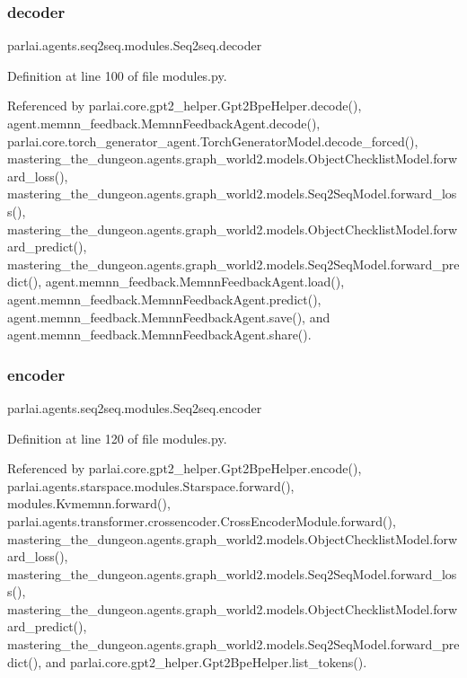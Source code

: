 \subsubsection{\texorpdfstring{decoder}{decoder}}
{\footnotesize\ttfamily parlai.\+agents.\+seq2seq.\+modules.\+Seq2seq.\+decoder}



Definition at line 100 of file modules.\+py.



Referenced by parlai.\+core.\+gpt2\+\_\+helper.\+Gpt2\+Bpe\+Helper.\+decode(), agent.\+memnn\+\_\+feedback.\+Memnn\+Feedback\+Agent.\+decode(), parlai.\+core.\+torch\+\_\+generator\+\_\+agent.\+Torch\+Generator\+Model.\+decode\+\_\+forced(), mastering\+\_\+the\+\_\+dungeon.\+agents.\+graph\+\_\+world2.\+models.\+Object\+Checklist\+Model.\+forward\+\_\+loss(), mastering\+\_\+the\+\_\+dungeon.\+agents.\+graph\+\_\+world2.\+models.\+Seq2\+Seq\+Model.\+forward\+\_\+loss(), mastering\+\_\+the\+\_\+dungeon.\+agents.\+graph\+\_\+world2.\+models.\+Object\+Checklist\+Model.\+forward\+\_\+predict(), mastering\+\_\+the\+\_\+dungeon.\+agents.\+graph\+\_\+world2.\+models.\+Seq2\+Seq\+Model.\+forward\+\_\+predict(), agent.\+memnn\+\_\+feedback.\+Memnn\+Feedback\+Agent.\+load(), agent.\+memnn\+\_\+feedback.\+Memnn\+Feedback\+Agent.\+predict(), agent.\+memnn\+\_\+feedback.\+Memnn\+Feedback\+Agent.\+save(), and agent.\+memnn\+\_\+feedback.\+Memnn\+Feedback\+Agent.\+share().

\mbox{\label{classparlai_1_1agents_1_1seq2seq_1_1modules_1_1Seq2seq_add3b14b89043ce0d8154810d082b0e52}} 
\subsubsection{\texorpdfstring{encoder}{encoder}}
{\footnotesize\ttfamily parlai.\+agents.\+seq2seq.\+modules.\+Seq2seq.\+encoder}



Definition at line 120 of file modules.\+py.



Referenced by parlai.\+core.\+gpt2\+\_\+helper.\+Gpt2\+Bpe\+Helper.\+encode(), parlai.\+agents.\+starspace.\+modules.\+Starspace.\+forward(), modules.\+Kvmemnn.\+forward(), parlai.\+agents.\+transformer.\+crossencoder.\+Cross\+Encoder\+Module.\+forward(), mastering\+\_\+the\+\_\+dungeon.\+agents.\+graph\+\_\+world2.\+models.\+Object\+Checklist\+Model.\+forward\+\_\+loss(), mastering\+\_\+the\+\_\+dungeon.\+agents.\+graph\+\_\+world2.\+models.\+Seq2\+Seq\+Model.\+forward\+\_\+loss(), mastering\+\_\+the\+\_\+dungeon.\+agents.\+graph\+\_\+world2.\+models.\+Object\+Checklist\+Model.\+forward\+\_\+predict(), mastering\+\_\+the\+\_\+dungeon.\+agents.\+graph\+\_\+world2.\+models.\+Seq2\+Seq\+Model.\+forward\+\_\+predict(), and parlai.\+core.\+gpt2\+\_\+helper.\+Gpt2\+Bpe\+Helper.\+list\+\_\+tokens().

